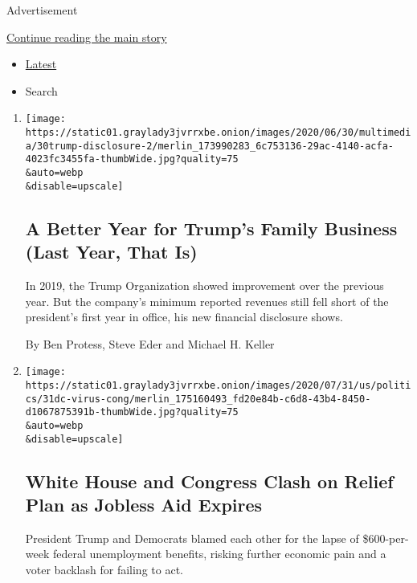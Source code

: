 Advertisement

\protect\hyperlink{after-mid1}{Continue reading the main story}

\begin{itemize}
\tightlist
\item
  \protect\hyperlink{stream-panel}{Latest}
\item
  Search
\end{itemize}

\begin{enumerate}
\def\labelenumi{\arabic{enumi}.}
\item
  \href{/2020/07/31/business/trump-financial-disclosure.html}{}

  \texttt{[image: https://static01.graylady3jvrrxbe.onion/images/2020/06/30/multimedia/30trump-disclosure-2/merlin\_173990283\_6c753136-29ac-4140-acfa-4023fc3455fa-thumbWide.jpg?quality=75\\\&auto=webp\\\&disable=upscale]}

  \hypertarget{a-better-year-for-trumps-family-business-last-year-that-is}{%
  \subsection{A Better Year for Trump's Family Business (Last Year, That
  Is)}\label{a-better-year-for-trumps-family-business-last-year-that-is}}

  In 2019, the Trump Organization showed improvement over the previous
  year. But the company's minimum reported revenues still fell short of
  the president's first year in office, his new financial disclosure
  shows.

  By Ben Protess, Steve Eder and Michael H. Keller
\item
  \href{/2020/07/31/us/politics/white-house-congress-relief-plan-jobless-aid.html}{}

  \texttt{[image: https://static01.graylady3jvrrxbe.onion/images/2020/07/31/us/politics/31dc-virus-cong/merlin\_175160493\_fd20e84b-c6d8-43b4-8450-d1067875391b-thumbWide.jpg?quality=75\\\&auto=webp\\\&disable=upscale]}

  \hypertarget{white-house-and-congress-clash-on-relief-plan-as-jobless-aid-expires}{%
  \subsection{White House and Congress Clash on Relief Plan as Jobless
  Aid
  Expires}\label{white-house-and-congress-clash-on-relief-plan-as-jobless-aid-expires}}

  President Trump and Democrats blamed each other for the lapse of
  \$600-per-week federal unemployment benefits, risking further economic
  pain and a voter backlash for failing to act.


\end{enumerate}
